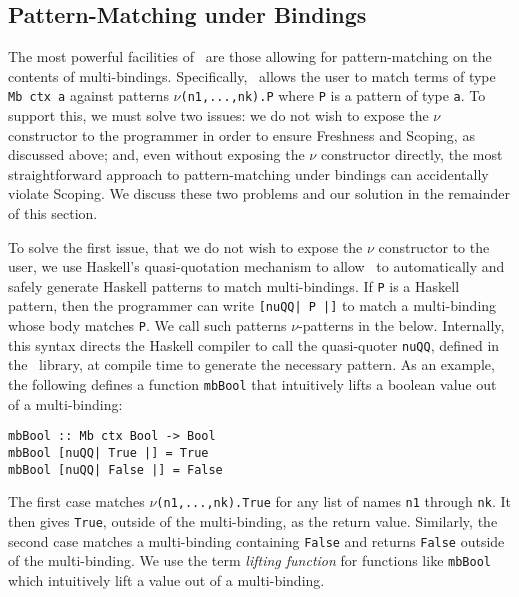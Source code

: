 \documentclass[natbib]{sigplanconf}
\begin{document}
\subsection{Pattern-Matching under Bindings}
\label{subsec:matching-under-bindings}

The most powerful facilities of \ourlib\ are those allowing for
pattern-matching on the contents of multi-bindings. Specifically,
\ourlib\ allows the user to match terms of type \lstinline{Mb ctx a}
against patterns $\nu$\lstinline{(n1,...,nk).P} where \lstinline{P} is
a pattern of type \lstinline{a}.  To support this, we must solve two
issues: we do not wish to expose the $\nu$ constructor to the
programmer in order to ensure Freshness and Scoping, as discussed
above; and, even without exposing the $\nu$ constructor directly, the
most straightforward approach to pattern-matching under bindings can
accidentally violate Scoping. We discuss these two problems and our
solution in the remainder of this section.


To solve the first issue, that we do not wish to expose the $\nu$
constructor to the user, we use Haskell's quasi-quotation mechanism
\cite{mainland07} to allow \ourlib\ to automatically and safely
generate Haskell patterns to match multi-bindings. If \lstinline{P} is
a Haskell pattern, then the programmer can write
\lstinline{[nuQQ| P |]} to match a multi-binding whose body matches
\lstinline{P}. We call such patterns $\nu$-patterns in the below.
Internally, this syntax directs the Haskell compiler to call the
quasi-quoter \lstinline{nuQQ}, defined in the \ourlib\ library, at
compile time to generate the necessary pattern. As an example, the
following defines a function \lstinline{mbBool} that intuitively lifts
a boolean value out of a multi-binding:
\begin{lstlisting}
mbBool :: Mb ctx Bool -> Bool
mbBool [nuQQ| True |] = True
mbBool [nuQQ| False |] = False
\end{lstlisting}
The first case matches $\nu$\lstinline{(n1,...,nk).True} for any list
of names \lstinline{n1} through \lstinline{nk}. It then gives
\lstinline{True}, outside of the multi-binding, as the return
value. Similarly, the second case matches a multi-binding containing
\lstinline{False} and returns \lstinline{False} outside of the
multi-binding. We use the term \emph{lifting function} for functions
like \lstinline{mbBool} which intuitively lift a value out of a
multi-binding.
\end{document}
